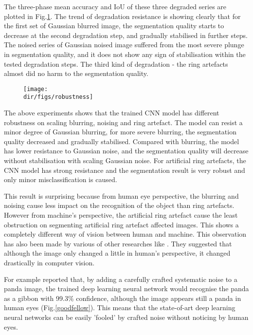 The three-phase mean accuracy and IoU of these three degraded series are plotted in Fig.\ref{robustness}. The trend of degradation resistance is showing clearly that for the first set of Gaussian blurred image, the segmentation quality starts to decrease at the second degradation step, and gradually stabilised in further steps. The noised series of Gaussian noised image suffered from the most severe plunge in segmentation quality, and it does not show any sign of stabilisation within the tested degradation steps. The third kind of degradation - the ring artefacts almost did no harm to the segmentation quality. 

\begin{figure}[htbp]
  \centering
  \texttt{[image: \\dir/figs/robustness]}
  \caption{}
  \label{robustness}
\end{figure}

The above experiments shows that the trained CNN model has different robustness on scaling blurring, noising and ring artefact. The model can resist a minor degree of Gaussian blurring, for more severe blurring, the segmentation quality decreased and gradually stabilised. Compared with blurring, the model has lower resistance to Gaussian noise, and the segmentation quality will decrease without stabilisation with scaling Gaussian noise. For artificial ring artefacts, the CNN model has strong resistance and the segmentation result is very robust and only minor misclassification is caused.

This result is surprising because from human eye perspective, the blurring and noising cause less impact on the recognition of the object than ring artefacts. However from machine's perspective, the artificial ring artefact cause the least obstruction on segmenting artificial ring artefact affected images. This shows a completely different way of vision between human and machine. This observation has also been made by various of other researches like \citet{nguyen2015deep,su2019one,goodfellow2014explaining}. They suggested that although the image only changed a little in human's perspective, it changed drastically in computer vision. 

For example \citet{goodfellow2014explaining} reported that, by adding a carefully crafted systematic noise to a panda image, the trained deep learning neural network would recognise the panda as a gibbon with 99.3\% confidence, although the image appears still a panda in human eyes (Fig.\ref{goodfellow}). This means that the state-of-art deep learning neural networks can be easily 'fooled' by crafted noise without noticing by human eyes.


